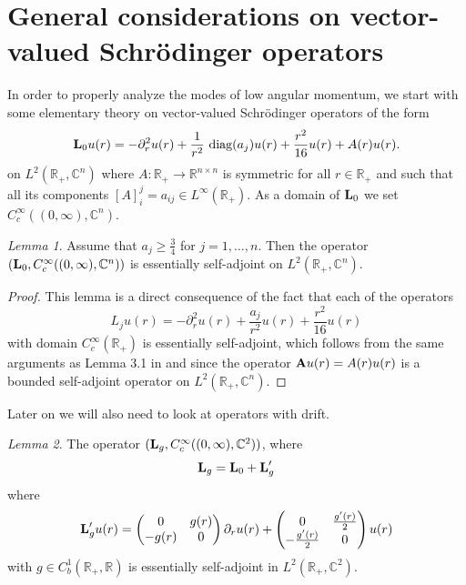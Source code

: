 \documentclass[11pt,reqno]{amsart}
\theoremstyle{remark}
\newtheorem{lem}{Lemma}[section]
\newcommand{\R}{\mathbb{R}}
\newcommand{\Lf}{\textup{\textbf{L}}}
\newcommand{\Af}{\textup{\textbf{A}}}
\newcommand{\C}{\mathbb{C}}
\theoremstyle{definition}
\begin{document}
\section{General considerations on vector-valued Schrödinger operators} \label{section:general schr}
In order to properly analyze the modes of low angular momentum, we start with some elementary theory on vector-valued Schrödinger operators of the form 
\begin{align}\label{def: basic operator}
    \Lf_0 u(r)= -\partial_r^2u(r)+\frac{1 }{r^2} \text{ diag}(a_j) u(r)+\frac{r^2}{16}u(r)+A(r)u(r).
\end{align}
on $ L^2(\R_+,\C^n)$  where $A:\R_+\to \R^{n\times n}$ is symmetric for all $r\in \R_+$ and such that all its components $ [A]_i^j=a_{ij}\in L^\infty(\R_+)$. As a domain of $\Lf_0$ we set $C_c^\infty((0,\infty),\C^n)$. 
\begin{lem}\label{lem: essentially selfadjoint}
   Assume that $a_j\geq \frac34$ for $j=1,\dots, n$. Then the operator $(\Lf_0,C_c^\infty((0,\infty),\C^n))$ is essentially self-adjoint on $L^2(\R_+,\C^n)$.
\end{lem}
\begin{proof}
  This lemma is a direct consequence of the fact that each of the operators $$L_j u(r)= -\partial_r^2u(r)+\frac{a_j }{r^2}  u(r)+\frac{r^2}{16} u(r)$$
    with domain $C^\infty_c(\R_+)$ is essentially self-adjoint, which follows from the same arguments as Lemma 3.1 in \cite{GloSch20} and since the operator $\Af u(r)= A(r) u(r)$ is a bounded self-adjoint operator on $L^2(\R_+,\C^n)$.
\end{proof}
Later on we will also need to look at operators with drift. 
\begin{lem}
    The operator $(\Lf_g,C_c^\infty((0,\infty),\C^2))$, where
    $$
     \Lf_g =\Lf_0+\Lf'_g
    $$
    where 
    \begin{align*}
      \Lf'_g u(r)=  \begin{pmatrix}
        0 & g(r)
        \\
        -g(r) &0
    \end{pmatrix}\partial_r u(r)
+
    \begin{pmatrix}
        0 & \frac{g'(r)}{2}
        \\
        -\frac{g'(r)}{2} &0
    \end{pmatrix}u(r)
    \end{align*}
    with $g\in C^1_b(\R_+,\R)$ is essentially self-adjoint in $L^2(\R_+,\C^2).$
\end{lem}
\end{document}
